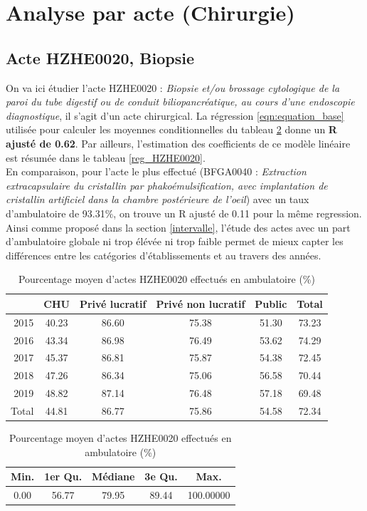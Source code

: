 \section{Analyse par acte (Chirurgie)} 

\subsection{Acte HZHE0020, Biopsie}

On va ici étudier l'acte HZHE0020 : \textit{Biopsie et/ou brossage cytologique de la paroi du tube digestif ou de conduit biliopancréatique, au cours d'une endoscopie diagnostique}, il s'agit d'un acte chirurgical. La régression \ref{eqn:equation_base} utilisée pour calculer les moyennes conditionnelles du tableau \ref{ambu_HZHE0020} donne un \textbf{R ajusté de 0.62}. Par ailleurs, l'estimation des coefficients de ce modèle linéaire est résumée dans le tableau \ref{reg_HZHE0020}.\\

En comparaison, pour l'acte le plus effectué (BFGA0040 : \textit{Extraction extracapsulaire du cristallin par phakoémulsification, avec implantation de cristallin artificiel dans la chambre postérieure de l'oeil}) avec un taux d'ambulatoire de 93.31\%, on trouve un R ajusté de 0.11 pour la même regression. Ainsi comme proposé dans la section \ref{intervalle}, l'étude des actes avec un part d'ambulatoire globale ni trop élévée ni trop faible permet de mieux capter les différences entre les catégories d'établissements et au travers des années.\\

\begin{table}[!ht]
\centering
\caption{Pourcentage moyen d'actes HZHE0020 effectués en ambulatoire (\%)} 
\label{ambu_HZHE0020}
\begin{tabular}{r|cccc|c}
  \hline
 & CHU & Privé lucratif & Privé non lucratif & Public & Total \\ 
  \hline
2015 & 40.23 & 86.60 & 75.38 & 51.30 & 73.23 \\ 
  2016 & 43.34 & 86.98 & 76.49 & 53.62 & 74.29 \\ 
  2017 & 45.37 & 86.81 & 75.87 & 54.38 & 72.45 \\ 
  2018 & 47.26 & 86.34 & 75.06 & 56.58 & 70.44 \\ 
  2019 & 48.82 & 87.14 & 76.48 & 57.18 & 69.48 \\ 
  \hline
  Total & 44.81 & 86.77 & 75.86 & 54.58 & 72.34 \\ 
   \hline
\end{tabular}
\bigskip

\begin{tabular}{ccccc}
  \hline
Min. & 1er Qu. & Médiane & 3e Qu. & Max. \\ 
  \hline
0.00 & 56.77 & 79.95 & 89.44 & 100.00000  \\ 
   \hline
\end{tabular}
\end{table}

